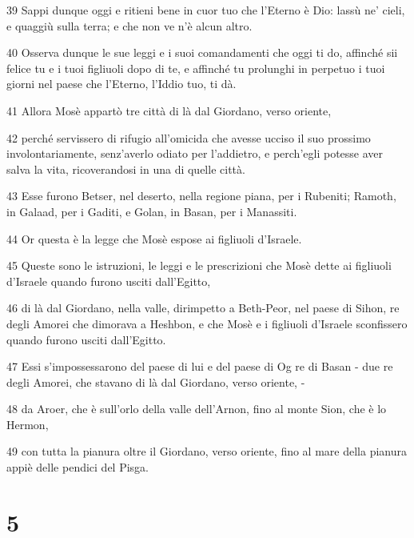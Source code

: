 \par 39 Sappi dunque oggi e ritieni bene in cuor tuo che l'Eterno è Dio: lassù ne' cieli, e quaggiù sulla terra; e che non ve n'è alcun altro.
\par 40 Osserva dunque le sue leggi e i suoi comandamenti che oggi ti do, affinché sii felice tu e i tuoi figliuoli dopo di te, e affinché tu prolunghi in perpetuo i tuoi giorni nel paese che l'Eterno, l'Iddio tuo, ti dà.
\par 41 Allora Mosè appartò tre città di là dal Giordano, verso oriente,
\par 42 perché servissero di rifugio all'omicida che avesse ucciso il suo prossimo involontariamente, senz'averlo odiato per l'addietro, e perch'egli potesse aver salva la vita, ricoverandosi in una di quelle città.
\par 43 Esse furono Betser, nel deserto, nella regione piana, per i Rubeniti; Ramoth, in Galaad, per i Gaditi, e Golan, in Basan, per i Manassiti.
\par 44 Or questa è la legge che Mosè espose ai figliuoli d'Israele.
\par 45 Queste sono le istruzioni, le leggi e le prescrizioni che Mosè dette ai figliuoli d'Israele quando furono usciti dall'Egitto,
\par 46 di là dal Giordano, nella valle, dirimpetto a Beth-Peor, nel paese di Sihon, re degli Amorei che dimorava a Heshbon, e che Mosè e i figliuoli d'Israele sconfissero quando furono usciti dall'Egitto.
\par 47 Essi s'impossessarono del paese di lui e del paese di Og re di Basan - due re degli Amorei, che stavano di là dal Giordano, verso oriente, -
\par 48 da Aroer, che è sull'orlo della valle dell'Arnon, fino al monte Sion, che è lo Hermon,
\par 49 con tutta la pianura oltre il Giordano, verso oriente, fino al mare della pianura appiè delle pendici del Pisga.

\chapter{5}

